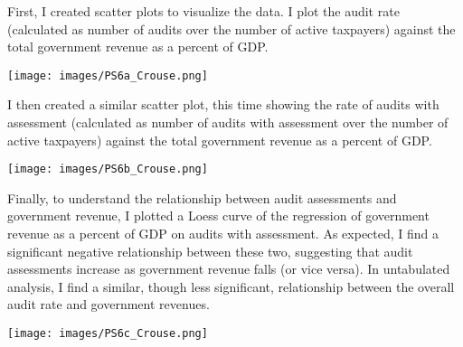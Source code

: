 \documentclass[nobib]{MSword}
\begin{document}
First, I created scatter plots to visualize the data. I plot the audit rate (calculated as number of audits over the number of active taxpayers) against the total government revenue as a percent of GDP.

\texttt{[image: images/PS6a\_Crouse.png]}

I then created a similar scatter plot, this time showing the rate of audits with assessment (calculated as number of audits with assessment over the number of active taxpayers) against the total government revenue as a percent of GDP.

\texttt{[image: images/PS6b\_Crouse.png]}

Finally, to understand the relationship between audit assessments and government revenue, I plotted a Loess curve of the regression of government revenue as a percent of GDP on audits with assessment. As expected, I find a significant negative relationship between these two, suggesting that audit assessments increase as government revenue falls (or vice versa). In untabulated analysis, I find a similar, though less significant, relationship between the overall audit rate and government revenues.

\texttt{[image: images/PS6c\_Crouse.png]}
\end{document}
